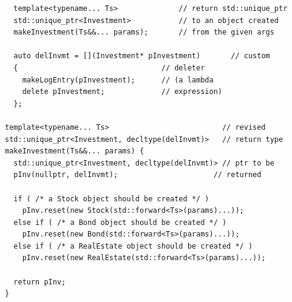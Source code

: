 \documentclass[a4paper]{exam}
\theoremstyle{definition}
\begin{document}
\begin{verbatim}
  template<typename... Ts>              // return std::unique_ptr
  std::unique_ptr<Investment>           // to an object created
  makeInvestment(Ts&&... params);       // from the given args

  auto delInvmt = [](Investment* pInvestment)       // custom
  {                                 // deleter
    makeLogEntry(pInvestment);      // (a lambda
    delete pInvestment;             // expression)
  };

template<typename... Ts>                          // revised
std::unique_ptr<Investment, decltype(delInvmt)>   // return type
makeInvestment(Ts&&... params) {
  std::unique_ptr<Investment, decltype(delInvmt)> // ptr to be
  pInv(nullptr, delInvmt);                      // returned

  if ( /* a Stock object should be created */ ) 
    pInv.reset(new Stock(std::forward<Ts>(params)...));
  else if ( /* a Bond object should be created */ ) 
    pInv.reset(new Bond(std::forward<Ts>(params)...));
  else if ( /* a RealEstate object should be created */ ) 
    pInv.reset(new RealEstate(std::forward<Ts>(params)...));

  return pInv;
}
\end{verbatim}
\end{document}
